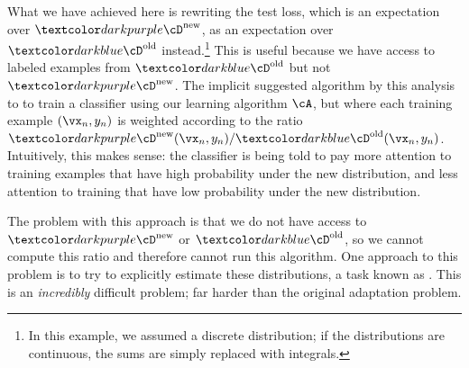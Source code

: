 What we have achieved here is rewriting the test loss, which is an expectation over $\Dnew$, as an expectation over $\Dold$ instead.\footnote{In this example, we assumed a discrete distribution; if the distributions are continuous, the sums are simply replaced with integrals.}
This is useful because we have access to labeled examples from $\Dold$ but not $\Dnew$.
The implicit suggested algorithm by this analysis to to train a classifier using our learning algorithm $\cA$, but where each training example $(\vx_n, y_n)$ is weighted according to the ratio $\Dnew(\vx_n,y_n) / \Dold(\vx_n,y_n)$.
Intuitively, this makes sense: the classifier is being told to pay more attention to training examples that have high probability under the new distribution, and less attention to training that have low probability under the new distribution.

The problem with this approach is that we do not have access to $\Dnew$ or $\Dold$, so we cannot compute this ratio and therefore cannot run this algorithm.
One approach to this problem is to try to explicitly estimate these distributions, a task known as .
This is an \emph{incredibly} difficult problem; far harder than the original adaptation problem.


